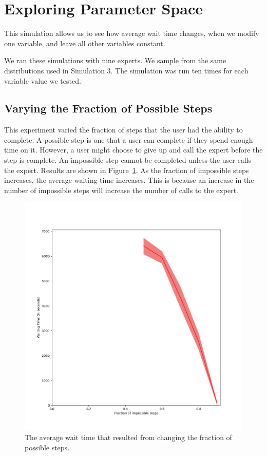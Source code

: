 \section{Exploring Parameter Space}

This simulation allows us to see how average wait time changes, when we modify
one variable, and leave all other variables constant.

We ran these simulations with nine experts.
We sample from the same distributions used in Simulation 3.
The simulation was run ten times for each variable value we tested.

\subsection{Varying the Fraction of Possible Steps}

This experiment varied the fraction of steps that the user had the ability to
complete.
A possible step is one that a user can complete if they spend enough time on it.
However, a user might choose to give up and call the expert before the step is
complete.
An impossible step cannot be completed unless the user calls the expert.
Results are shown in Figure~\ref{fig:vary_success}.
As the fraction of impossible steps increases, the average waiting time
increases.
This is because an increase in the number of impossible steps will increase the
number of calls to the expert.

\begin{figure}[H]
  \includegraphics[width=\textwidth]{figures/montecarlo/vary_success.png}
  \caption{
    The average wait time that resulted from changing the fraction of possible
    steps.
  }\label{fig:vary_success}
\end{figure}

